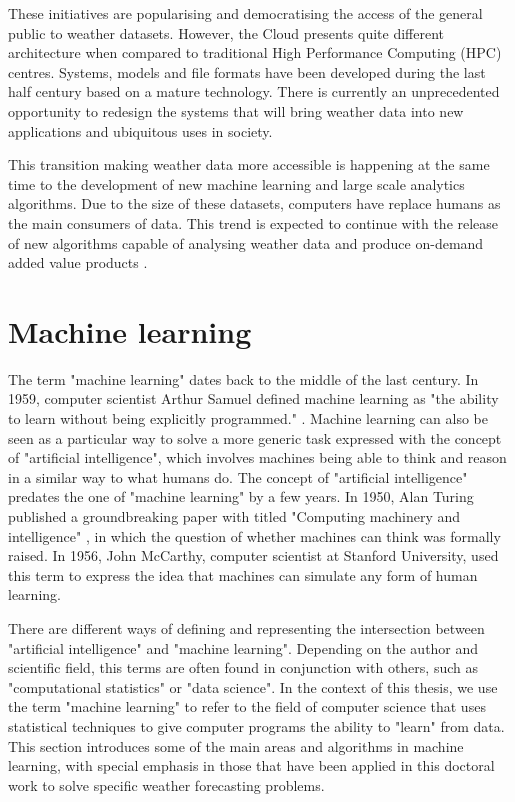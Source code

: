 \medskip

These initiatives are popularising and democratising the access of the general public to weather datasets. However, the Cloud presents quite different architecture when compared to traditional High Performance Computing (HPC) centres. Systems, models and file formats have been developed during the last half century based on a mature technology. There is currently an unprecedented opportunity to redesign the systems that will bring weather data into new applications and ubiquitous uses in society.

\medskip

This transition making weather data more accessible is happening at the same time to the development of new machine learning and large scale analytics algorithms. Due to the size of these datasets, computers have replace humans as the main consumers of data. This trend is expected to continue with the release of new algorithms capable of analysing weather data and produce on-demand added value products \citep{cloudai,awsml}.


\section{Machine learning}

The term "machine learning" dates back to the middle of the last century. In 1959, computer scientist Arthur Samuel defined machine learning as "the ability to learn without being explicitly programmed." \citep{samuel1959some}. Machine learning can also be seen as a particular way to solve a more generic task expressed with the concept of "artificial intelligence", which involves machines being able to think and reason in a similar way to what humans do. The concept of "artificial intelligence" predates the one of "machine learning" by a few years. In 1950, Alan Turing published a groundbreaking paper with titled "Computing machinery and intelligence" \citep{turing2009computing}, in which the question of whether machines can think was formally raised. In 1956, John McCarthy, computer scientist at Stanford University, used this term to express the idea that machines can simulate any form of human learning.

\medskip

There are different ways of defining and representing the intersection between "artificial intelligence" and "machine learning". Depending on the author and scientific field, this terms are often found in conjunction with others, such as "computational statistics" or "data science". In the context of this thesis, we use the term "machine learning" to refer to the field of computer science that uses statistical techniques to give computer programs the ability to "learn" from data. This section introduces some of the main areas and algorithms in machine learning, with special emphasis in those that have been applied in this doctoral work to solve specific weather forecasting problems.

